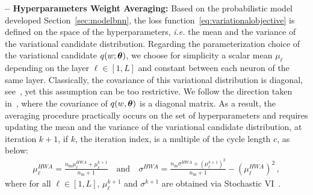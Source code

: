 \documentclass[tablecaption=bottom,wcp]{jmlr}
\begin{document}
\textbf{-- Hyperparameters Weight Averaging:}
Based on the probabilistic model developed Section~\ref{sec:modelbnn}, the loss function~\eqref{eq:variationalobjective} is defined on the space of the hyperparameters, \textit{i.e.} the mean and the variance of the variational candidate distribution.
Regarding the parameterization choice of the variational candidate $q( w; \param )$, we choose for simplicity a scalar mean $\mu_{\ell}$ depending on the layer $\ell \in [1,L]$ and constant between each neuron of the same layer. 
Classically, the covariance of this variational distribution is diagonal, see~\citep{kirkpatrick2017overcoming, blundell2015weight}, yet this assumption can be too restrictive.
We follow the direction taken in~\citep{maddox2019simple}, where the covariance of $q(w, \param)$ is a diagonal matrix.
As a result, the averaging procedure practically occurs on the set of hyperparameters and requires updating the mean and the variance of the variational candidate distribution, at iteration $k+1$, if $k$, the iteration index, is a multiple of the cycle length $c$,  as below:
\begin{equation}\label{eq:hwa_updates}
\begin{split}
 \mu_{\ell}^{HWA}  =  \frac{n_{\textrm{m}}\mu_{\ell}^{HWA} + \mu_{\ell}^{k+1}}{n_{\textrm{m}}+1}  \quad \textrm{and} \quad  \sigma^{HWA}   =  \frac{n_{\textrm{m}}\sigma^{HWA} + (\mu_{\ell}^{k+1})^2}{n_{\textrm{m}}+1} -( \mu_{\ell}^{HWA})^2 \, ,
\end{split}
\end{equation}
where for all $\ell \in [1,L]$, $\mu_{\ell}^{k+1}$ and $\sigma^{k+1}$ are obtained via Stochastic VI~\citep{hoffman2013stochastic}.
\end{document}

